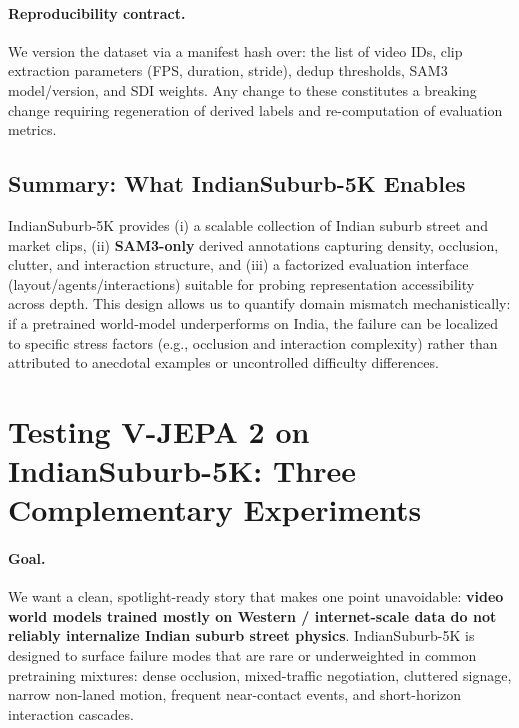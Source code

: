 \paragraph{Reproducibility contract.}
We version the dataset via a manifest hash over: the list of video IDs, clip extraction parameters (FPS, duration, stride), dedup thresholds, SAM3 model/version, and SDI weights. Any change to these constitutes a breaking change requiring regeneration of derived labels and re-computation of evaluation metrics.

\subsection{Summary: What IndianSuburb-5K Enables}
\label{sec:indiasuburb5k_summary}
IndianSuburb-5K provides (i) a scalable collection of Indian suburb street and market clips, (ii) \textbf{SAM3-only} derived annotations capturing density, occlusion, clutter, and interaction structure, and (iii) a factorized evaluation interface (layout/agents/interactions) suitable for probing representation accessibility across depth. This design allows us to quantify domain mismatch mechanistically: if a pretrained world-model underperforms on India, the failure can be localized to specific stress factors (e.g., occlusion and interaction complexity) rather than attributed to anecdotal examples or uncontrolled difficulty differences.































\section{Testing V-JEPA 2 on IndianSuburb-5K: Three Complementary Experiments}
\label{sec:vjepa2_indiasuburb5k_eval}

\paragraph{Goal.}
We want a clean, spotlight-ready story that makes one point unavoidable: \textbf{video world models trained mostly on Western / internet-scale data do not reliably internalize Indian suburb street physics}. IndianSuburb-5K is designed to surface failure modes that are rare or underweighted in common pretraining mixtures: dense occlusion, mixed-traffic negotiation, cluttered signage, narrow non-laned motion, frequent near-contact events, and short-horizon interaction cascades.

